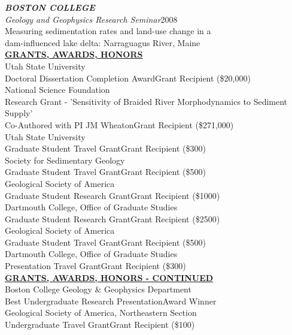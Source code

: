 \documentclass{article}
\begin{document}
\noindent \textit{\textbf{BOSTON COLLEGE}}\\
\textit{Geology and Geophysics Research Seminar}\hfill{}2008\\
Measuring sedimentation rates and land-use change in a\\ dam-influenced lake delta: Narraguagus River, Maine\\

\noindent \textbf{\underline{GRANTS, AWARDS, HONORS}}\\
Utah State University\\
\indent Doctoral Dissertation Completion Award\hfill{}Grant Recipient (\$20,000)\\
National Science Foundation\\
\indent Research Grant - 'Sensitivity of Braided River Morphodynamics to Sediment Supply'\\
\indent Co-Authored with PI JM Wheaton\hfill{}Grant Recipient (\$271,000)\\
Utah State University\\
\indent Graduate Student Travel Grant\hfill{}Grant Recipient (\$300)\\
Society for Sedimentary Geology\\
\indent Graduate Student Travel Grant\hfill{}Grant Recipient (\$500)\\
Geological Society of America\\
\indent Graduate Student Research Grant\hfill{}Grant Recipient (\$1000)\\
Dartmouth College, Office of Graduate Studies\\
\indent Graduate Student Research Grant\hfill{}Grant Recipient (\$2500)\\
\noindent Geological Society of America\\
\indent Graduate Student Travel Grant\hfill{}Grant Recipient (\$500)\\
Dartmouth College, Office of Graduate Studies\\
\indent Presentation Travel Grant\hfill{}Grant Recipient (\$300)\\
\noindent \textbf{\underline{GRANTS, AWARDS, HONORS - CONTINUED}}\\
Boston College Geology $\&$ Geophysics Department\\
\indent Best Undergraduate Research Presentation\hfill{}Award Winner\\
Geological Society of America, Northeastern Section\\
\indent Undergraduate Travel Grant\hfill{}Grant Recipient (\$100)\\
\end{document}
